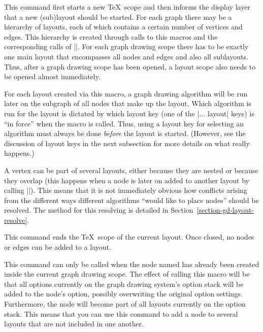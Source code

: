 \begin{command}{\pgfgdbeginlayout}
    This command first starts a new \TeX\ scope and then informs the display
    layer that a new (sub)layout should be started. For each graph there may be
    a hierarchy of layouts, each of which contains a certain number of vertices
    and edges. This hierarchy is created through calls to this macros and the
    corresponding calls of |\pgfgdendlayout|. For each graph drawing scope
    there has to be exactly one main layout that encompasses all nodes and
    edges and also all sublayouts. Thus, after a graph drawing scope has been
    opened, a layout scope also needs to be opened almost immediately.

    For each layout created via this macro, a graph drawing algorithm will be
    run later on the subgraph of all nodes that make up the layout. Which
    algorithm is run for the layout is dictated by which layout key (one of the
    |... layout| keys) is ``in force'' when the macro is called. Thus, using a
    layout key for selecting an algorithm must always be done \emph{before} the
    layout is started. (However, see the discussion of layout keys in the next
    subsection for more details on what really happens.)

    A vertex can be part of several layouts, either because they are nested or
    because they overlap (this happens when a node is later on added to another
    layout by calling |\pgfgdsetlatenodeoption|). This means that it is not
    immediately obvious how conflicts arising from the different ways different
    algorithms ``would like to place nodes'' should be resolved. The method for
    this resolving is detailed in Section~\ref{section-gd-layout-resolve}.
\end{command}

\begin{command}{\pgfgdendlayout}
    This command ends the \TeX\ scope of the current layout. Once closed, no
    nodes or edges can be added to a layout.
\end{command}

\begin{command}{\pgfgdsetlatenodeoption{}}
    This command can only be called when the node named  has
    already been created inside the current graph drawing scope. The effect of
    calling this macro will be that all options currently on the graph drawing
    system's option stack will be added to the node's option, possibly
    overwriting the original option settings. Furthermore, the node will become
    part of all layouts currently on the option stack. This means that you can
    use this command to add a node to several layouts that are not included in
    one another.
\end{command}



